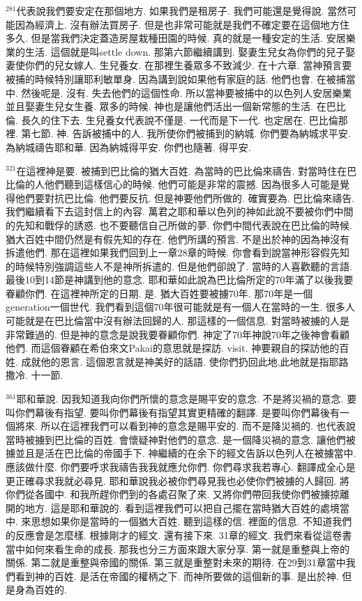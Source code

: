 \documentclass{book}
\begin{document}
$^{281}$代表說我們要安定在那個地方.
如果我們是租房子.
我們可能還是覺得說.
當然可能因為經濟上.
沒有辦法買房子.
但是也非常可能就是我們不確定要在這個地方住多久.
但是當我們決定蓋造房屋栽種田園的時候.
真的就是一種安定的生活.
安居樂業的生活.
這個就是叫settle down.
那第六節繼續講到.
娶妻生兒女為你們的兒子娶妻使你們的兒女嫁人.
生兒養女.
在那裡生養眾多不致減少.
在十六章.
當神預言要被捕的時候特別讓耶利敏單身.
因為講到說如果他有家庭的話.
他們也會.
在被捕當中.
然後呢是.
沒有.
失去他們的這個性命.
所以當神要被捕中的以色列人安居樂業並且娶妻生兒女生養.
眾多的時候.
神也是讓他們活出一個新常態的生活.
在巴比倫.
長久的住下去.
生兒養女代表說不僅是.
一代而是下一代.
也定居在.
巴比倫那裡.
第七節.
神.
告訴被捕中的人.
我所使你們被捕到的納城.
你們要為納城求平安.
為納城禱告耶和華.
因為納城得平安.
你們也隨著.
得平安.

$^{321}$在這裡神是要.
被捕到巴比倫的猶大百姓.
為當時的巴比倫來禱告.
對當時住在巴比倫的人他們聽到這樣信心的時候.
他們可能是非常的震撼.
因為很多人可能是覺得他們要對抗巴比倫.
他們要反抗.
但是神要他們所做的.
確實要為.
巴比倫來禱告.
我們繼續看下去這封信上的內容.
萬君之耶和華以色列的神如此說不要被你們中間的先知和戰俘的誘惑.
也不要聽信自己所做的夢.
你們中間代表說在巴比倫的時候.
猶大百姓中間仍然是有假先知的存在.
他們所講的預言.
不是出於神的因為神沒有拆遣他們.
那在這裡如果我們回到上一章28章的時候.
你會看到說當神形容假先知的時候特別強調這些人不是神所拆遣的.
但是他們卻說了.
當時的人喜歡聽的言語.
最後10到14節是神講到他的意念.
耶和華如此說為巴比倫所定的70年滿了以後我要眷顧你們.
在這裡神所定的日期.
是.
猶大百姓要被擄70年.
那70年是一個generation一個世代.
我們看到這個70年很可能就是有一個人在當時的一生.
很多人可能就是在巴比倫當中沒有辦法回歸的人.
那這樣的一個信息.
對當時被擄的人是非常難過的.
但是神的意念是說我要眷顧你們.
神定了70年神說70年之後神會看顧他們.
而這個眷顧在希伯來文Pakai的意思就是探訪.
visit.
神要親自的探訪他的百姓.
成就他的恩言.
這個恩言就是神美好的話語.
使你們扔回此地,此地就是指耶路撒冷.
十一節.

$^{361}$耶和華說.
因我知道我向你們所懷的意念是賜平安的意念.
不是將災禍的意念.
要叫你們幕後有指望.
要叫你們幕後有指望其實更精確的翻譯.
是要叫你們幕後有一個將來.
所以在這裡我們可以看到神的意念是賜平安的.
而不是降災禍的.
也代表說當時被擄到巴比倫的百姓.
會懷疑神對他們的意念.
是一個降災禍的意念.
讓他們被擄並且是活在巴比倫的帝國手下.
神繼續的在余下的經文告訴以色列人在被擄當中.
應該做什麼.
你們要呼求我禱告我我就應允你們.
你們尋求我若專心.
翻譯成全心是更正確尋求我就必尋見.
耶和華說我必被你們尋見我也必使你們被擄的人歸回.
將你們從各國中.
和我所趕你們到的各處召聚了來.
又將你們帶回我使你們被擄掠離開的地方.
這是耶和華說的.
看到這裡我們可以把自己擺在當時猶大百姓的處境當中.
來思想如果你是當時的一個猶大百姓.
聽到這樣的信.
裡面的信息.
不知道我們的反應會是怎麼樣.
根據剛才的經文.
還有接下來.
31章的經文.
我們來看從這卷書當中如何來看生命的成長.
那我也分三方面來跟大家分享.
第一就是重整與上帝的關係.
第二就是重整與帝國的關係.
第三就是重整對未來的期待.
在29到31章當中我們看到神的百姓.
是活在帝國的權柄之下.
而神所要做的這個新的事.
是出於神.
但是身為百姓的.
\end{document}

